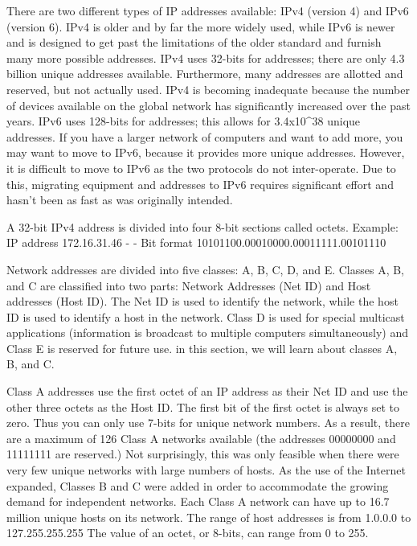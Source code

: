 There are two different types of IP addresses available: IPv4 (version
4) and IPv6 (version 6). IPv4 is older and by far the more widely used,
while IPv6 is newer and is designed to get past the limitations of the
older standard and furnish many more possible addresses. IPv4 uses
32-bits for addresses; there are only 4.3 billion unique addresses
available. Furthermore, many addresses are allotted and reserved, but
not actually used. IPv4 is becoming inadequate because the number of
devices available on the global network has significantly increased over
the past years. IPv6 uses 128-bits for addresses; this allows for
3.4x10\^{}38 unique addresses. If you have a larger network of computers
and want to add more, you may want to move to IPv6, because it provides
more unique addresses. However, it is difficult to move to IPv6 as the
two protocols do not inter-operate. Due to this, migrating equipment and
addresses to IPv6 requires significant effort and hasn't been as fast as
was originally intended.

A 32-bit IPv4 address is divided into four 8-bit sections called octets.
Example: IP address \textbar{} 172.16.31.46 - \textbar{} - Bit format
\textbar{} 10101100.00010000.00011111.00101110

Network addresses are divided into five classes: A, B, C, D, and E.
Classes A, B, and C are classified into two parts: Network Addresses
(Net ID) and Host addresses (Host ID). The Net ID is used to identify
the network, while the host ID is used to identify a host in the
network. Class D is used for special multicast applications (information
is broadcast to multiple computers simultaneously) and Class E is
reserved for future use. in this section, we will learn about classes A,
B, and C.

Class A addresses use the first octet of an IP address as their Net ID
and use the other three octets as the Host ID. The first bit of the
first octet is always set to zero. Thus you can only use 7-bits for
unique network numbers. As a result, there are a maximum of 126 Class A
networks available (the addresses 00000000 and 11111111 are reserved.)
Not surprisingly, this was only feasible when there were very few unique
networks with large numbers of hosts. As the use of the Internet
expanded, Classes B and C were added in order to accommodate the growing
demand for independent networks. Each Class A network can have up to
16.7 million unique hosts on its network. The range of host addresses is
from 1.0.0.0 to 127.255.255.255 The value of an octet, or 8-bits, can
range from 0 to 255.

